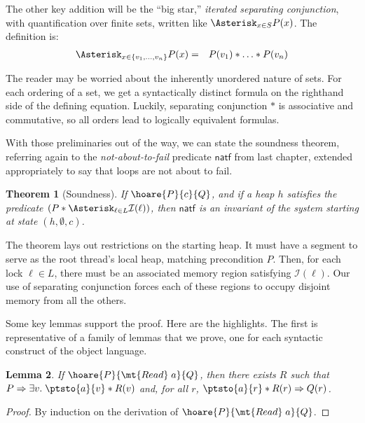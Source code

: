 \documentclass{amsbook}
\newtheorem{theorem}{Theorem}[chapter]
\newtheorem{lemma}[theorem]{Lemma}
\theoremstyle{definition}
\theoremstyle{remark}
\numberwithin{section}{chapter}
\numberwithin{equation}{chapter}
\begin{document}
\renewcommand{\bigstar}[3]{\Asterisk_{#1 \in #2} #3}
\newcommand{\bigstarp}[3]{\Asterisk_{#1 \in #2} {\left ( #3 \right )}}

The other key addition will be the ``big star,'' \emph{iterated separating conjunction}, with quantification over finite sets, written like $\bigstar{x}{S}{P(x)}$.
The definition is:
\begin{eqnarray*}
  \bigstar{x}{\{v_1, \ldots, v_n\}}{P(x)} &=& P(v_1) * \ldots * P(v_n)
\end{eqnarray*}

The reader may be worried about the inherently unordered nature of sets.
For each ordering of a set, we get a syntactically distinct formula on the righthand side of the defining equation.
Luckily, separating conjunction $*$ is associative and commutative, so all orders lead to logically equivalent formulas.

With those preliminaries out of the way, we can state the soundness theorem, referring again to the \emph{not-about-to-fail} predicate $\mathsf{natf}$ from last chapter, extended appropriately to say that loops are not about to fail.

\invariants
\begin{theorem}[Soundness]
  If $\hoare{P}{c}{Q}$, and if a heap $h$ satisfies the predicate $(P * \bigstar{\ell}{L}{\mathcal I(\ell)})$, then $\mathsf{natf}$ is an invariant of the system starting at state $(h, \emptyset, c)$.
\end{theorem}

The theorem lays out restrictions on the starting heap.
It must have a segment to serve as the root thread's local heap, matching precondition $P$.
Then, for each lock $\ell \in L$, there must be an associated memory region satisfying $\mathcal I(\ell)$.
Our use of separating conjunction forces each of these regions to occupy disjoint memory from all the others.

Some key lemmas support the proof.
Here are the highlights.
The first is representative of a family of lemmas that we prove, one for each syntactic construct of the object language.

\begin{lemma}
  If $\hoare{P}{\mt{Read} \; a}{Q}$, then there exists $R$ such that $P \Rightarrow \exists v. \; \ptsto{a}{v} * R(v)$ and, for all $r$, $\ptsto{a}{r} * R(r) \Rightarrow Q(r)$.
\end{lemma}
\begin{proof}
  By induction on the derivation of $\hoare{P}{\mt{Read} \; a}{Q}$.
\end{proof}
\end{document}
